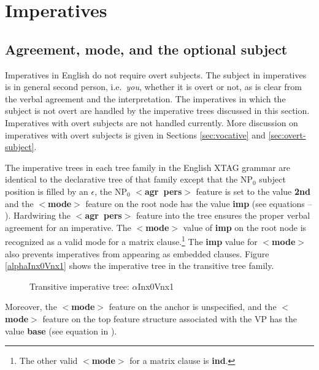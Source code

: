 
\chapter{Imperatives}
\label{imperatives}

\section{Agreement, mode, and the optional subject}

Imperatives in English do not require overt subjects.  The subject in
imperatives is in general second person, i.e.\ {\it you}, whether it is
overt or not, as is clear from the verbal agreement and the interpretation.
The imperatives in which the subject is not overt are handled by the
imperative trees discussed in this section.  Imperatives with overt
subjects are not handled currently.  More discussion on imperatives with
overt subjects is given in Sections \ref{sec:vocative} and
\ref{sec:overt-subject}.

The imperative trees in each tree family in the English XTAG grammar are
identical to the declarative tree of that family except that the NP$_{0}$
subject position is filled by an $\epsilon$, the NP$_{0}$ {\bf
$<$agr~pers$>$} feature is set to the value {\bf 2nd} and the {\bf
$<$mode$>$} feature on the root node has the value {\bf imp} (see equations
 -- ). Hardwiring the {\bf $<$agr~pers$>$} feature into the
tree ensures the proper verbal agreement for an imperative.  The {\bf
$<$mode$>$} value of {\bf imp} on the root node is recognized as a valid
mode for a matrix clause.\footnote{%
%
The other valid {\bf $<$mode$>$} for a matrix clause is {\bf ind}.%
%
} The {\bf imp} value for {\bf $<$mode$>$} also prevents imperatives from
appearing as embedded clauses.  Figure \ref{alphaInx0Vnx1} shows the
imperative tree in the transitive tree family.



\begin{figure}[htbp]
\caption{Transitive imperative tree: $\alpha$Inx0Vnx1}
\label{alphaInx0Vnx1}
\label{2;11,1}
\end{figure}


Moreover, the {\bf $<$mode$>$} feature on the anchor is unspecified, and
the {\bf $<$mode$>$} feature on the top feature structure associated with
the VP has the value {\bf base} (see equation in ).

